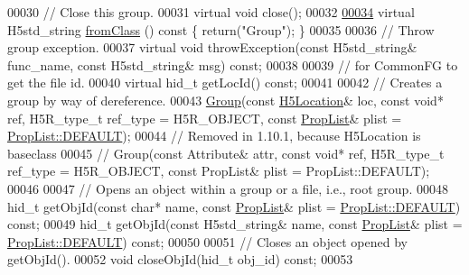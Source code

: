 \begin{DoxyCode}
00030         \textcolor{comment}{// Close this group.}
00031         \textcolor{keyword}{virtual} \textcolor{keywordtype}{void} close();
00032 
\hyperlink{class_h5_1_1_group_abb4ed8f72b879befe5bd125b64c07c8a}{00034}         \textcolor{keyword}{virtual} H5std\_string \hyperlink{class_h5_1_1_group_abb4ed8f72b879befe5bd125b64c07c8a}{fromClass} ()\textcolor{keyword}{ const }\{ \textcolor{keywordflow}{return}(\textcolor{stringliteral}{"Group"}); \}
00035 
00036         \textcolor{comment}{// Throw group exception.}
00037         \textcolor{keyword}{virtual} \textcolor{keywordtype}{void} throwException(\textcolor{keyword}{const} H5std\_string& func\_name, \textcolor{keyword}{const} H5std\_string& msg) \textcolor{keyword}{const};
00038 
00039         \textcolor{comment}{// for CommonFG to get the file id.}
00040         \textcolor{keyword}{virtual} hid\_t getLocId() \textcolor{keyword}{const};
00041 
00042         \textcolor{comment}{// Creates a group by way of dereference.}
00043         \hyperlink{class_h5_1_1_group}{Group}(\textcolor{keyword}{const} \hyperlink{class_h5_1_1_h5_location}{H5Location}& loc, \textcolor{keyword}{const} \textcolor{keywordtype}{void}* ref, H5R\_type\_t ref\_type = H5R\_OBJECT, \textcolor{keyword}{
      const} \hyperlink{class_h5_1_1_prop_list}{PropList}& plist = \hyperlink{class_h5_1_1_prop_list_ae52af66ce82af0ea7e6dc57148c56241}{PropList::DEFAULT});
00044         \textcolor{comment}{// Removed in 1.10.1, because H5Location is baseclass}
00045 \textcolor{comment}{//        Group(const Attribute& attr, const void* ref, H5R\_type\_t ref\_type = H5R\_OBJECT, const PropList&
       plist = PropList::DEFAULT);}
00046 
00047         \textcolor{comment}{// Opens an object within a group or a file, i.e., root group.}
00048         hid\_t getObjId(\textcolor{keyword}{const} \textcolor{keywordtype}{char}* name, \textcolor{keyword}{const} \hyperlink{class_h5_1_1_prop_list}{PropList}& plist = 
      \hyperlink{class_h5_1_1_prop_list_ae52af66ce82af0ea7e6dc57148c56241}{PropList::DEFAULT}) \textcolor{keyword}{const};
00049         hid\_t getObjId(\textcolor{keyword}{const} H5std\_string& name, \textcolor{keyword}{const} \hyperlink{class_h5_1_1_prop_list}{PropList}& plist = 
      \hyperlink{class_h5_1_1_prop_list_ae52af66ce82af0ea7e6dc57148c56241}{PropList::DEFAULT}) \textcolor{keyword}{const};
00050 
00051         \textcolor{comment}{// Closes an object opened by getObjId().}
00052         \textcolor{keywordtype}{void} closeObjId(hid\_t obj\_id) \textcolor{keyword}{const};
00053 

\end{DoxyCode}

